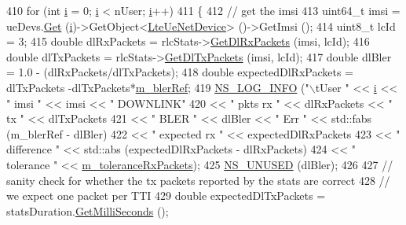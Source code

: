 \begin{DoxyCode}
410   \textcolor{keywordflow}{for} (\textcolor{keywordtype}{int} \hyperlink{bernuolliDistribution_8m_a6f6ccfcf58b31cb6412107d9d5281426}{i} = 0; \hyperlink{bernuolliDistribution_8m_a6f6ccfcf58b31cb6412107d9d5281426}{i} < nUser; \hyperlink{bernuolliDistribution_8m_a6f6ccfcf58b31cb6412107d9d5281426}{i}++)
411     \{
412       \textcolor{comment}{// get the imsi}
413       uint64\_t imsi = ueDevs.\hyperlink{classns3_1_1NetDeviceContainer_a677d62594b5c9d2dea155cc5045f4d0b}{Get} (\hyperlink{bernuolliDistribution_8m_a6f6ccfcf58b31cb6412107d9d5281426}{i})->GetObject<\hyperlink{classns3_1_1LteUeNetDevice}{LteUeNetDevice}> ()->GetImsi ();
414       uint8\_t lcId = 3;
415       \textcolor{keywordtype}{double} dlRxPackets = rlcStats->\hyperlink{classns3_1_1RadioBearerStatsCalculator_a164d36dc82ed7dae2f4d748da502589a}{GetDlRxPackets} (imsi, lcId);
416       \textcolor{keywordtype}{double} dlTxPackets = rlcStats->\hyperlink{classns3_1_1RadioBearerStatsCalculator_a55f9b9c664e1389ad9edf704e385299c}{GetDlTxPackets} (imsi, lcId);
417       \textcolor{keywordtype}{double} dlBler = 1.0 - (dlRxPackets/dlTxPackets);
418       \textcolor{keywordtype}{double} expectedDlRxPackets = dlTxPackets -dlTxPackets*\hyperlink{classLenaDlCtrlPhyErrorModelTestCase_a3395f76e96e52bb60a7b0c6a5259019d}{m\_blerRef};
419       \hyperlink{group__logging_gafbd73ee2cf9f26b319f49086d8e860fb}{NS\_LOG\_INFO} (\textcolor{stringliteral}{"\(\backslash\)tUser "} << \hyperlink{bernuolliDistribution_8m_a6f6ccfcf58b31cb6412107d9d5281426}{i} << \textcolor{stringliteral}{" imsi "} << imsi << \textcolor{stringliteral}{" DOWNLINK"}
420                    << \textcolor{stringliteral}{" pkts rx "} << dlRxPackets << \textcolor{stringliteral}{" tx "} << dlTxPackets
421                    << \textcolor{stringliteral}{" BLER "} << dlBler << \textcolor{stringliteral}{" Err "} << std::fabs (m\_blerRef - dlBler)
422                    << \textcolor{stringliteral}{" expected rx "} << expectedDlRxPackets
423                    << \textcolor{stringliteral}{" difference "} << std::abs (expectedDlRxPackets - dlRxPackets)
424                    << \textcolor{stringliteral}{" tolerance "} << \hyperlink{classLenaDlCtrlPhyErrorModelTestCase_aeea53cbe22fe11495e338820c8bd1515}{m\_toleranceRxPackets});
425       \hyperlink{unused_8h_a3ba03ad859378e9f01285afb60f0e3ab}{NS\_UNUSED} (dlBler);
426 
427       \textcolor{comment}{// sanity check for whether the tx packets reported by the stats are correct}
428       \textcolor{comment}{// we expect one packet per TTI}
429       \textcolor{keywordtype}{double} expectedDlTxPackets = statsDuration.\hyperlink{classns3_1_1Time_aba3428a8b6c4c8d9014ce44145081f34}{GetMilliSeconds} ();

\end{DoxyCode}

